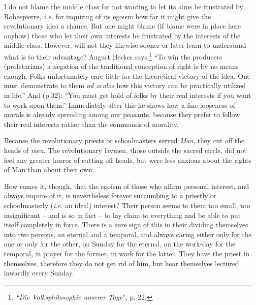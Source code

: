 \documentclass[12pt,a4paper]{book}
\begin{document}
I do not blame the middle class for not wanting to let its aims be frustrated 
by Robespierre, \textit{i.e.} for inquiring of its egoism how far it might 
give the revolutionary idea a chance. But one might blame (if blame were in 
place here anyhow) those who let their own interests be frustrated by the 
interests of the middle class. However, will not they likewise sooner or later 
learn to understand what is to their advantage? August Becker 
says:\footnote{\textit{``Die Volksphilosophie unserer Tage}'', p. 22.} ``To 
win the producers (proletarians) a negation of the traditional conception of 
right is by no means enough. Folks unfortunately care little for the 
theoretical victory of the idea. One must demonstrate to them \textit{ad 
oculos} how this victory can be practically utilized in life.'' And (p.32): 
``You must get hold of folks by their real interests if you want to work upon 
them.'' Immediately after this he shows how a fine looseness of morals is 
already spreading among our peasants, because they prefer to follow their real 
interests rather than the commands of morality.

Because the revolutionary priests or schoolmasters served \textit{Man}, they 
cut off the heads of \textit{men}. The revolutionary laymen, those outside the 
sacred circle, did not feel any greater horror of cutting off heads, but were 
less anxious about the rights of Man than about their own.

How comes it, though, that the egoism of those who affirm personal interest, 
and always inquire of it, is nevertheless forever succumbing to a priestly or 
schoolmasterly (\textit{i.e.} an ideal) interest? Their person seems to them 
too small, too insignificant -- and is so in fact -- to lay claim to 
everything and be able to put itself completely in force. There is a sure sign 
of this in their dividing themselves into two persons, an eternal and a 
temporal, and always caring either only for the one or only for the other, on 
Sunday for the eternal, on the work-day for the temporal, in prayer for the 
former, in work for the latter. They have the priest in themselves, therefore 
they do not get rid of him, but hear themselves lectured inwardly every 
Sunday.
\end{document}
